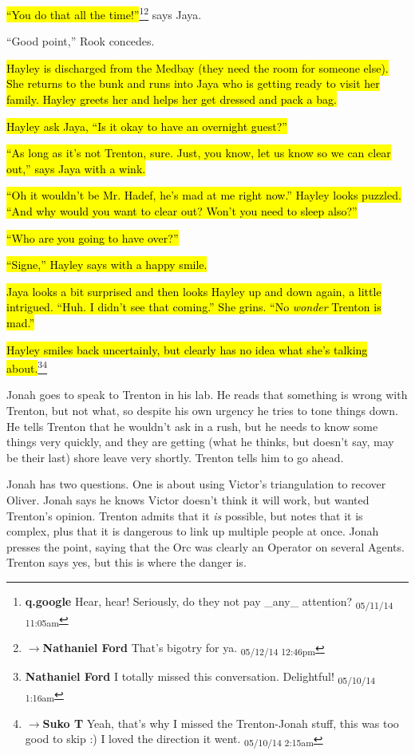 \hl{``You do that all the time!''}\footnote{\textbf{q.google }Hear, hear!  Seriously, do they not pay \_any\_ attention? \textsubscript{05/11/14 11:05am}}\footnote{$\rightarrow$\textbf{Nathaniel Ford }That's bigotry for ya. \textsubscript{05/12/14 12:46pm}} says Jaya.

``Good point,'' Rook concedes.



\hl{Hayley is discharged from the Medbay (they need the room for someone else).  She returns to the bunk and runs into Jaya who is getting ready to visit her family.  Hayley greets her and helps her get dressed and pack a bag.}

\hl{Hayley ask Jaya, ``Is it okay to have an overnight guest?''}

\hl{``As long as it's not Trenton, sure.  Just, you know, let us know so we can clear out,'' says Jaya with a wink.}

\hl{``Oh it wouldn't be Mr. Hadef, he's mad at me right now.''  Hayley looks puzzled.  ``And why would you want to clear out?  Won't you need to sleep also?''}

\hl{``Who are you going to have over?''}

\hl{``Signe,'' Hayley says with a happy smile.}

\hl{Jaya looks a bit surprised and then looks Hayley up and down again, a little intrigued.  ``Huh.  I didn't see that coming.''  She grins.  ``No \textit{wonder} Trenton is mad.''}

\hl{Hayley smiles back uncertainly, but clearly has no idea what she's talking about.}\footnote{\textbf{Nathaniel Ford }I totally missed this conversation. Delightful! \textsubscript{05/10/14 1:16am}}\footnote{$\rightarrow$\textbf{Suko T }Yeah, that's why I missed the Trenton-Jonah stuff, this was too good to skip :)  I loved the direction it went. \textsubscript{05/10/14 2:15am}}



Jonah goes to speak to Trenton in his lab.  He reads that something is wrong with Trenton, but not what, so despite his own urgency he tries to tone things down.  He tells Trenton that he wouldn't ask in a rush, but he needs to know some things very quickly, and they are getting (what he thinks, but doesn't say, may be their last) shore leave very shortly.  Trenton tells him to go ahead.

Jonah has two questions.  One is about using Victor's triangulation to recover Oliver.  Jonah says he knows Victor doesn't think it will work, but wanted Trenton's opinion.  Trenton admits that it \textit{is} possible, but notes that it is complex, plus that it is dangerous to link up multiple people at once.  Jonah presses the point, saying that the Orc was clearly an Operator on several Agents.  Trenton says yes, but this is where the danger is.

